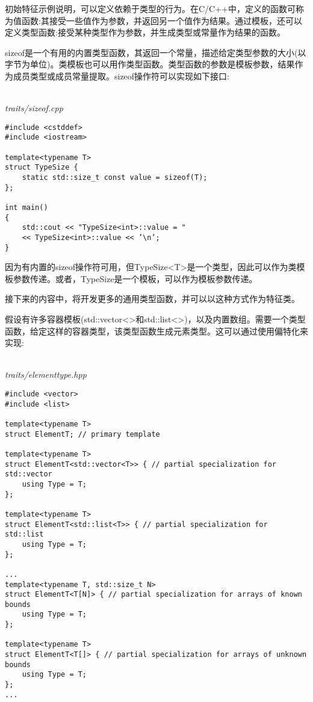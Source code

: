 
初始特征示例说明，可以定义依赖于类型的行为。在C/C++中，定义的函数可称为值函数:其接受一些值作为参数，并返回另一个值作为结果。通过模板，还可以定义类型函数:接受某种类型作为参数，并生成类型或常量作为结果的函数。

sizeof是一个有用的内置类型函数，其返回一个常量，描述给定类型参数的大小(以字节为单位)。类模板也可以用作类型函数。类型函数的参数是模板参数，结果作为成员类型或成员常量提取。sizeof操作符可以实现如下接口:

\hspace*{\fill} \\ %
\noindent
\textit{traits/sizeof.cpp}
\begin{lstlisting}[style=styleCXX]
#include <cstddef>
#include <iostream>

template<typename T>
struct TypeSize {
	static std::size_t const value = sizeof(T);
};

int main()
{
	std::cout << "TypeSize<int>::value = "
	<< TypeSize<int>::value << ’\n’;
}
\end{lstlisting}

因为有内置的sizeof操作符可用，但TypeSize<T>是一个类型，因此可以作为类模板参数传递。或者，TypeSize是一个模板，可以作为模板参数传递。

接下来的内容中，将开发更多的通用类型函数，并可以以这种方式作为特征类。


假设有许多容器模板(std::vector<>和std::list<>)，以及内置数组。需要一个类型函数，给定这样的容器类型，该类型函数生成元素类型。这可以通过使用偏特化来实现:

\hspace*{\fill} \\ %
\noindent
\textit{traits/elementtype.hpp}
\begin{lstlisting}[style=styleCXX]
#include <vector>
#include <list>

template<typename T>
struct ElementT; // primary template

template<typename T>
struct ElementT<std::vector<T>> { // partial specialization for std::vector
	using Type = T;
};

template<typename T>
struct ElementT<std::list<T>> { // partial specialization for std::list
	using Type = T;
};

...
template<typename T, std::size_t N>
struct ElementT<T[N]> { // partial specialization for arrays of known bounds
	using Type = T;
};

template<typename T>
struct ElementT<T[]> { // partial specialization for arrays of unknown bounds
	using Type = T;
};
...
\end{lstlisting}

